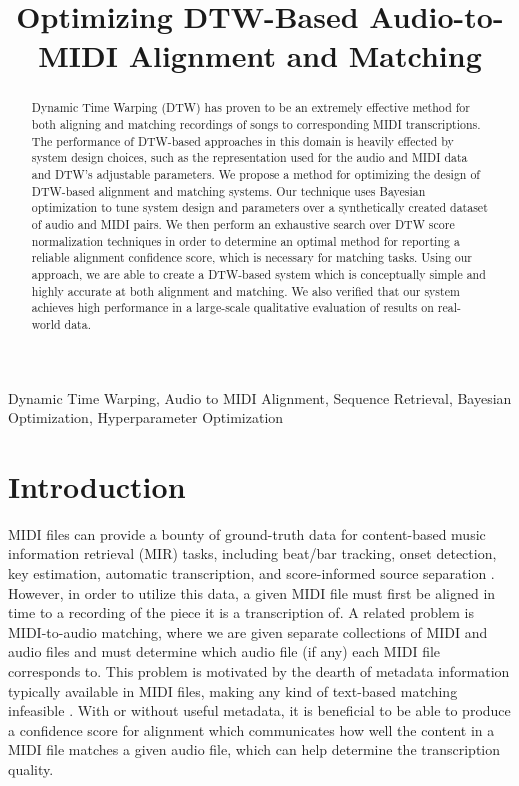 \documentclass{article}
\title{Optimizing DTW-Based Audio-to-MIDI Alignment and Matching}
\begin{document}
\ninept
\maketitle

\begin{abstract}
Dynamic Time Warping (DTW) has proven to be an extremely effective method for both aligning and matching recordings of songs to corresponding MIDI transcriptions.
The performance of DTW-based approaches in this domain is heavily effected by system design choices, such as the representation used for the audio and MIDI data and DTW's adjustable parameters.
We propose a method for optimizing the design of DTW-based alignment and matching systems.
Our technique uses Bayesian optimization to tune system design and parameters over a synthetically created dataset of audio and MIDI pairs.
We then perform an exhaustive search over DTW score normalization techniques in order to determine an optimal method for reporting a reliable alignment confidence score, which is necessary for matching tasks.
Using our approach, we are able to create a DTW-based system which is conceptually simple and highly accurate at both alignment and matching.
We also verified that our system achieves high performance in a large-scale qualitative evaluation of results on real-world data.
\end{abstract}

\begin{keywords}
Dynamic Time Warping, Audio to MIDI Alignment, Sequence Retrieval, Bayesian Optimization, Hyperparameter Optimization
\end{keywords}

\section{Introduction}
\label{sec:intro}

MIDI files can provide a bounty of ground-truth data for content-based music information retrieval (MIR) tasks, including beat/bar tracking, onset detection, key estimation, automatic transcription, and score-informed source separation \cite{ewert2012towards, turetsky2003ground, ewert2014score, raffel2014pretty_midi}.
However, in order to utilize this data, a given MIDI file must first be aligned in time to a recording of the piece it is a transcription of.
A related problem is MIDI-to-audio matching, where we are given separate collections of MIDI and audio files and must determine which audio file (if any) each MIDI file corresponds to.
This problem is motivated by the dearth of metadata information typically available in MIDI files, making any kind of text-based matching infeasible \cite{raffel2015large}.
With or without useful metadata, it is beneficial to be able to produce a confidence score for alignment which communicates how well the content in a MIDI file matches a given audio file, which can help determine the transcription quality.
\end{document}
